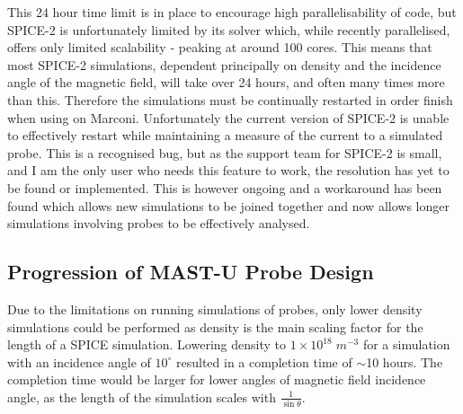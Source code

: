 \documentclass[a4paper, 12pt]{article} %
\begin{document}
    This 24 hour time limit is in place to encourage high parallelisability of code, but SPICE-2 is unfortunately limited by its solver which, while recently parallelised, offers only limited scalability - peaking at around 100 cores.
    This means that most SPICE-2 simulations, dependent principally on density and the incidence angle of the magnetic field, will take over 24 hours, and often many times more than this. 
    Therefore the simulations must be continually restarted in order finish when using on Marconi. 
    Unfortunately the current version of SPICE-2 is unable to effectively restart while maintaining a measure of the current to a simulated probe. 
    This is a recognised bug, but as the support team for SPICE-2 is small, and I am the only user who needs this feature to work, the resolution has yet to be found or implemented.
    This is however ongoing and a workaround has been found which allows new simulations to be joined together and now allows longer simulations involving probes to be effectively analysed. 
    
	
\subsection{\label{subsec:mastu_probe_design} Progression of MAST-U Probe Design}
	Due to the limitations on running simulations of probes, only lower density simulations could be performed as density is the main scaling factor for the length of a SPICE simulation.
	Lowering density to $1 \times 10^{18} \; m^{-3}$ for a simulation with an incidence angle of $10^{\circ}$ resulted in a completion time of $\sim$10 hours.
	The completion time would be larger for lower angles of magnetic field incidence angle, as the length of the simulation scales with $\frac{1}{\sin{\theta}}$. 
	
\end{document}

